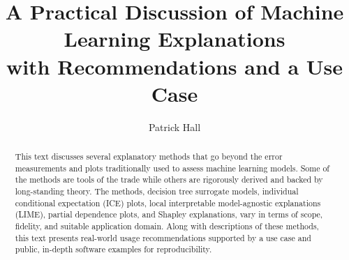 \documentclass[sigconf, review]{acmart}
\begin{document}
%
\title[Machine Learning Explanations]{A Practical Discussion of Machine Learning Explanations\\ with Recommendations and a Use Case}

%
\author{Patrick Hall}

\renewcommand{\shortauthors}{Hall, Patrick}

%
\begin{abstract}
This text discusses several explanatory methods that go beyond the error measurements and plots 			traditionally used to assess machine learning models. Some of the methods are tools of the trade while others are rigorously derived and backed by long-standing theory. The methods, decision tree surrogate models, individual conditional expectation (ICE) plots, local interpretable model-agnostic explanations (LIME), partial dependence plots, and Shapley explanations, vary in terms of scope, fidelity, and suitable application domain.  Along with descriptions of these methods, this text presents real-world usage recommendations supported by a use case and public, in-depth software examples for reproducibility.
\end{abstract}
\end{document}
